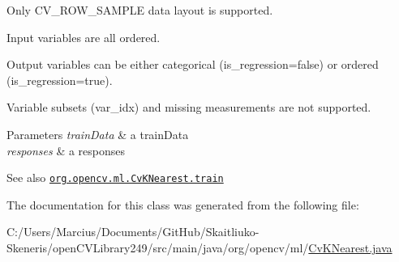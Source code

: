 \begin{DoxyItemize}
\item Only {\ttfamily C\+V\+\_\+\+R\+O\+W\+\_\+\+S\+A\+M\+P\+LE} data layout is supported. 
\item Input variables are all ordered. 
\item Output variables can be either categorical ({\ttfamily is\+\_\+regression=false}) or ordered ({\ttfamily is\+\_\+regression=true}). 
\item Variable subsets ({\ttfamily var\+\_\+idx}) and missing measurements are not supported. 
\end{DoxyItemize}


\begin{DoxyParams}{Parameters}
{\em train\+Data} & a train\+Data \\
\hline
{\em responses} & a responses\\
\hline
\end{DoxyParams}
\begin{DoxySeeAlso}{See also}
\href{http://docs.opencv.org/modules/ml/doc/k_nearest_neighbors.html#cvknearest-train}{\tt org.\+opencv.\+ml.\+Cv\+K\+Nearest.\+train} 
\end{DoxySeeAlso}


The documentation for this class was generated from the following file\+:\begin{DoxyCompactItemize}
\item 
C\+:/\+Users/\+Marcius/\+Documents/\+Git\+Hub/\+Skaitliuko-\/\+Skeneris/open\+C\+V\+Library249/src/main/java/org/opencv/ml/\mbox{\hyperlink{_cv_k_nearest_8java}{Cv\+K\+Nearest.\+java}}\end{DoxyCompactItemize}
